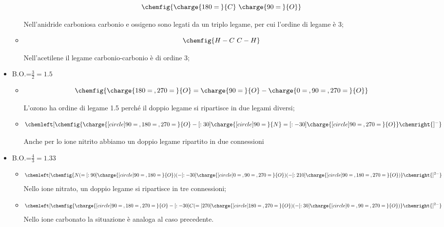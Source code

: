 \begin{itemize}
\begin{itemize}
        $$
        \chemfig{\charge{180=\:}{C}~\charge{90=\:}{O}}
        $$

        Nell'anidride carboniosa carbonio e ossigeno sono legati da un triplo legame, per cui l'ordine di legame è 3;
        \item {}
        
        $$
        \chemfig{H-C~C-H}
        $$

        Nell'acetilene il legame carbonio-carbonio è di ordine 3;
    \end{itemize}
    \item B.O.=$\frac{3}{2}=1.5$
    \begin{itemize}
        \item {}
        
        $$
        \chemfig{\charge{180=\:,270=\:}{O}=\charge{90=\:}{O}-\charge{0=\:,90=\:,270=\:}{O}}
        $$

        L'ozono ha ordine di legame 1.5 perché il doppio legame si ripartisce in due legami diversi;
        \item {}
        
        $$
        \chemleft[ \chemfig{\charge{[circle]90=\:,180=\:,270=\:}{O}-[:30]\charge{[circle]90=\:}{N}=[:-30]\charge{[circle]90=\:,270=\:}{O}} \chemright{]^{-}}
        $$

        Anche per lo ione nitrito abbiamo un doppio legame ripartito in due connessioni
    \end{itemize}
    \item B.O.=$\frac{4}{3}=1.33$
    \begin{itemize}
        \item {}
        
        $$
        \chemleft[ \chemfig{N(=[:90]\charge{[circle]90=\:,180=\:}{O})(-[:-30]\charge{[circle]0=\:,90=\:,270=\:}{O})(-[:210]\charge{[circle]90=\:,180=\:,270=\:}{O})} \chemright{]^{2-}}
        $$
        Nello ione nitrato, un doppio legame si ripartisce in tre connessioni;
        \item {}
        
        $$
        \chemleft[ \chemfig{\charge{[circle]90=\:,180=\:,270=\:}{O}-[:-30]C(=[270]\charge{[circle]180=\:,270=\:}{O})(-[:30]\charge{[circle]0=\:,90=\:,270=\:}{O})} \chemright{]^{2-}}
        $$
        Nello ione carbonato la situazione è analoga al caso precedente.
    \end{itemize}
\end{itemize}
